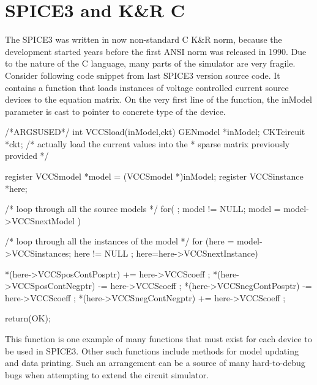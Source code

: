 \section{SPICE3 and K\&R C}
The SPICE3 was written in now non-standard C K\&R norm, because the development started years before the first ANSI norm was released in 1990. Due to the nature of the C language, many parts of the simulator are very fragile. Consider following code snippet from last SPICE3 version source code. It contains a function that loads instances of voltage controlled current source devices to the equation matrix. On the very first line of the function, the  inModel parameter is cast to pointer to concrete type of the device.

\begin{code}
	/*ARGSUSED*/
	int
	VCCSload(inModel,ckt)
	GENmodel *inModel;
	CKTcircuit *ckt;
	/* actually load the current values into the 
	* sparse matrix previously provided 
	*/
	{
		register VCCSmodel *model = (VCCSmodel *)inModel;
		register VCCSinstance *here;
		
		/*  loop through all the source models */
		for( ; model != NULL; model = model->VCCSnextModel ) {
			
			/* loop through all the instances of the model */
			for (here = model->VCCSinstances; here != NULL ;
			here=here->VCCSnextInstance) {
				
				*(here->VCCSposContPosptr) += here->VCCScoeff ;
				*(here->VCCSposContNegptr) -= here->VCCScoeff ;
				*(here->VCCSnegContPosptr) -= here->VCCScoeff ;
				*(here->VCCSnegContNegptr) += here->VCCScoeff ;
			}
		}
		return(OK);
	}
\end{code}

This function is one example of many functions that must exist for each device to be used in SPICE3. Other such functions include methods for model updating and data printing. Such an arrangement can be a source of many hard-to-debug bugs when attempting to extend the circuit simulator.

%
%
%
%
%

